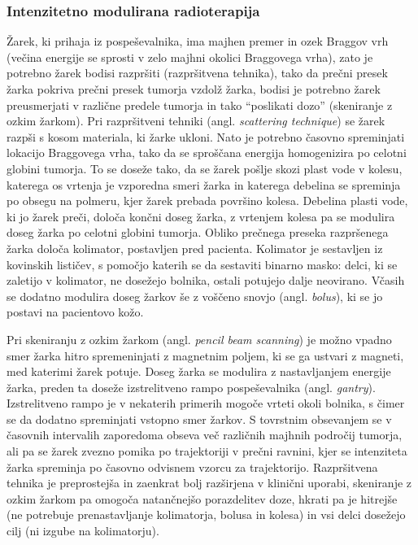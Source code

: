 \documentclass[a4paper,twoside,11pt]{article}
\begin{document}
	\subsubsection*{Intenzitetno modulirana radioterapija}
	\par{
	  Žarek, ki prihaja iz pospeševalnika, ima majhen premer in ozek Braggov vrh (večina energije se sprosti v zelo majhni okolici Braggovega vrha), zato je potrebno žarek bodisi razpršiti (razpršitvena tehnika), tako da prečni presek žarka pokriva prečni presek tumorja vzdolž žarka, bodisi je potrebno žarek preusmerjati v različne predele tumorja in tako ``poslikati dozo'' (skeniranje z ozkim žarkom). Pri razpršitveni tehniki (angl. \emph{scattering technique}) se žarek razpši s kosom materiala, ki žarke ukloni. Nato je potrebno časovno spreminjati lokacijo Braggovega vrha, tako da se sproščana energija homogenizira po celotni globini tumorja. To se doseže tako, da se žarek pošlje skozi plast vode v kolesu, katerega os vrtenja je vzporedna smeri žarka in katerega debelina se spreminja po obsegu na polmeru, kjer žarek prebada površino kolesa. Debelina plasti vode, ki jo žarek preči, določa končni doseg žarka, z vrtenjem kolesa pa se modulira doseg žarka po celotni globini tumorja. Obliko prečnega preseka razpršenega žarka določa kolimator, postavljen pred pacienta. Kolimator je sestavljen iz kovinskih lističev, s pomočjo katerih se da sestaviti binarno masko: delci, ki se zaletijo v kolimator, ne dosežejo bolnika, ostali potujejo dalje neovirano. Včasih se dodatno modulira doseg žarkov še z voščeno snovjo (angl. \emph{bolus}), ki se jo postavi na pacientovo kožo.
	}
	\par{
	  Pri skeniranju z ozkim žarkom (angl. \emph{pencil beam scanning}) je možno vpadno smer žarka hitro spremeninjati z magnetnim poljem, ki se ga ustvari z magneti, med katerimi žarek potuje. Doseg žarka se modulira z nastavljanjem energije žarka, preden ta doseže izstrelitveno rampo pospeševalnika (angl. \emph{gantry}). Izstrelitveno rampo je v nekaterih primerih mogoče vrteti okoli bolnika, s čimer se da dodatno spreminjati vstopno smer žarkov. S tovrstnim obsevanjem se v časovnih intervalih zaporedoma obseva več različnih majhnih področij tumorja, ali pa se žarek zvezno pomika po trajektoriji v prečni ravnini, kjer se intenziteta žarka spreminja po časovno odvisnem vzorcu za trajektorijo. Razpršitvena tehnika je preprostejša in zaenkrat bolj razširjena v klinični uporabi, skeniranje z ozkim žarkom pa omogoča natančnejšo porazdelitev doze, hkrati pa je hitrejše (ne potrebuje prenastavljanje kolimatorja, bolusa in kolesa) in vsi delci dosežejo cilj (ni izgube na kolimatorju). \cite{schippers2011}
	}
\end{document}
